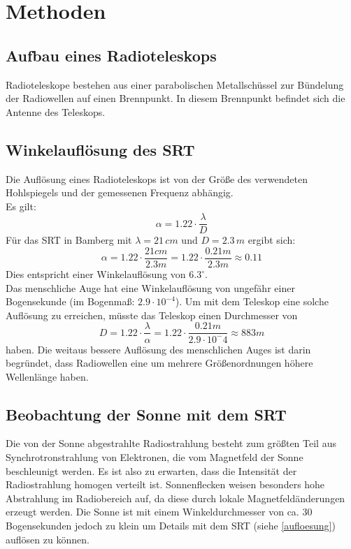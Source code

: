 \section{Methoden}
\subsection{Aufbau eines Radioteleskops}
Radioteleskope bestehen aus einer parabolischen Metallschüssel zur Bündelung der Radiowellen auf einen Brennpunkt. In diesem Brennpunkt befindet sich die Antenne des Teleskops. 
\subsection{Winkelauflösung des SRT}
Die Auflösung eines Radioteleskops ist von der Größe des verwendeten Hohlspiegels und der gemessenen Frequenz abhängig.\\
Es gilt:
\begin{equation}
\alpha = 1.22\cdot\frac{\lambda}{D}
\end{equation}
Für das SRT in Bamberg mit $\lambda=21\,cm$ und $D=2.3\, m$ ergibt sich:
\begin{equation}
\alpha = 1.22\cdot\frac{21 cm}{2.3 m} = 1.22\cdot\frac{0.21 m}{2.3 m} \approx 0.11
\label{aufloesung}
\end{equation}
Dies entspricht einer Winkelauflösung von $6.3^\circ$.
\\
Das menschliche Auge hat eine Winkelauflösung von ungefähr einer Bogensekunde (im Bogenmaß: $2.9\cdot10^{-4}$). Um mit dem Teleskop eine solche Auflösung zu erreichen, müsste das Teleskop einen Durchmesser von
\begin{equation}
D = 1.22\cdot\frac{\lambda}{\alpha} = 1.22\cdot\frac{0.21 m}{2.9\cdot10^-4} \approx 883 m
\end{equation}
haben. Die weitaus bessere Auflösung des menschlichen Auges ist darin begründet, dass Radiowellen eine um mehrere Größenordnungen höhere Wellenlänge haben.
\subsection{Beobachtung der Sonne mit dem SRT}
Die von der Sonne abgestrahlte Radiostrahlung besteht zum größten Teil aus Synchrotronstrahlung von Elektronen, die vom Magnetfeld der Sonne beschleunigt werden. Es ist also zu erwarten, dass die Intensität der Radiostrahlung homogen verteilt ist. Sonnenflecken weisen besonders hohe Abstrahlung im Radiobereich auf, da diese durch lokale Magnetfeldänderungen erzeugt werden. Die Sonne ist mit einem Winkeldurchmesser von ca. 30 Bogensekunden jedoch zu klein um Details mit dem SRT (siehe \eqref{aufloesung}) auflösen zu können.\\


